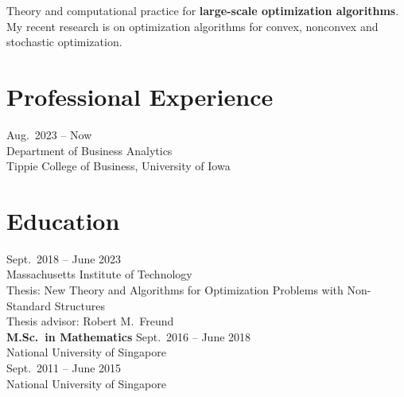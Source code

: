 \documentclass[11pt]{article}
\begin{document}
\noindent Theory and computational practice for {\bf large-scale optimization algorithms}. %
My recent  research is on optimization algorithms for  convex, nonconvex and stochastic optimization. %

\section*{\large Professional Experience}


 \hfill Aug.\ 2023 -- Now\\
Department of Business Analytics\\
{Tippie College of Business, University of Iowa}




\section*{\large Education}


 \hfill Sept.\ 2018 -- June 2023 \\
{Massachusetts Institute of Technology} \\ %
{Thesis}: {New Theory and Algorithms for Optimization Problems with Non-Standard Structures} \\
{ Thesis advisor}: {Robert M.\ Freund}\\

{\noindent \bf M.Sc.\ in Mathematics}  \hfill Sept.\ 2016 -- June 2018\\
  {National University of Singapore}\\


 \hfill Sept.\ 2011  -- June 2015\\
{National University of Singapore} \\   %
\end{document}
